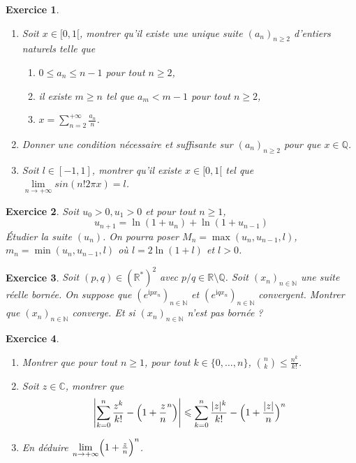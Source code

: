 \documentclass[12pt]{article}
\newtheorem{exercise}{Exercice}[section]
\theoremstyle{remark}
\theoremstyle{remark}
\newcommand{\R}{\mathbb{R}}
\newcommand{\C}{\mathbb{C}}
\newcommand{\Q}{\mathbb{Q}}
\newcommand{\N}{\mathbb{N}}
\begin{document}
\begin{exercise}
	\phantom{}
	\begin{enumerate}
		\item Soit $x\in[0,1[$, montrer qu'il existe une unique suite
		$(a_{n})_{n\geqslant 2}$ d'entiers naturels telle que 
		\begin{enumerate}
			\item [(i)] $0\leqslant a_{n}\leqslant n-1$ pour tout $n\geqslant2$,
			\item [(ii)] il existe $m\geqslant n$ tel que $a_{m}<m-1$ pour tout $n\geqslant2$,
			\item [(iii)] $x=\sum_{n=2}^{+\infty}\frac{a_{n}}{n}$.
		\end{enumerate}
		\item Donner une condition nécessaire et suffisante sur
		$(a_{n})_{n\geqslant2}$ pour que $x\in\Q$.
		\item Soit $l\in[-1,1]$, montrer qu'il existe $x\in[0,1[$ tel que $\lim\limits_{n\to+\infty}sin(n!2\pi x)=l$.
	\end{enumerate}
\end{exercise}

\begin{exercise}
	Soit $u_0>0,u_1>0$ et pour tout $n\geqslant 1$,
	$$u_{n+1}=\ln(1+u_{n})+\ln(1+u_{n-1})$$
	Étudier la suite $(u_{n})$. On pourra poser $M_{n}=\max(u_{n},u_{n-1},l)$,
	$m_{n}=\min(u_{n},u_{n-1},l)$ où $l=2\ln(1+l)$ et $l>0$.
\end{exercise}

\begin{exercise}
	Soit $(p,q)\in(\R^{*})^{2}$ avec $p/q\in\R\setminus\Q$. Soit
	$(x_{n})_{n\in\N}$ une suite réelle bornée. On suppose que
	$(e^{\mathrm{i}px_{n}})_{n\in\N}$ et $(e^{\mathrm{i}qx_{n}})_{n\in\N}$
	convergent. Montrer que $(x_{n})_{n\in\N}$ converge. Et si
	$(x_{n})_{n\in\N}$ n'est pas bornée ?
\end{exercise}

\begin{exercise}
	\phantom{}
	\begin{enumerate}
		\item Montrer que pour tout $n\geqslant1$, pour tout
		$k\in\{0,\dots,n\}$, $\binom{n}{k}\leqslant\frac{n^{k}}{k!}$.
		\item Soit $z\in\C$, montrer que 
		$$\Biggl\vert\sum_{k=0}^{n}\frac{z^{k}}{k!}-\Bigl(1+\frac{z}{n}^{n}\Bigr)\Biggr\vert\leqslant\sum_{k=0}^{n}\frac{\vert
		z\vert^{k}}{k!}-\Bigl(1+\frac{\vert z\vert}{n}\Bigr)^{n}$$
		\item En déduire $\lim\limits_{n\to+\infty}\Bigl(1+\frac{z}{n}\Bigr)^{n}$.
	\end{enumerate}
\end{exercise}
\end{document}
